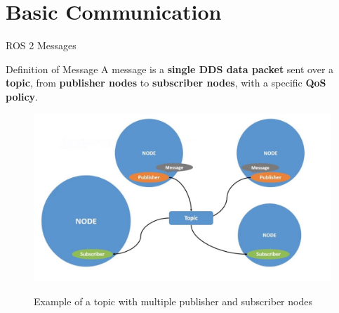 
\section{Basic Communication}
\graphicspath{{figs/section3/}}

\begin{frame}{ROS 2 Messages}
    \begin{block}{Definition of Message}
      A message is a \textbf{single DDS data packet} sent over a \textbf{topic}, from \textbf{publisher nodes} to \textbf{subscriber nodes}, with a specific \textbf{QoS policy}.
    \end{block}
    \begin{figure}
      \centering
      \includegraphics[scale=.19]{ros2Msg.jpg}
      \label{fig:msg}
      \caption{Example of a topic with multiple publisher and subscriber nodes}
    \end{figure}
\end{frame}


